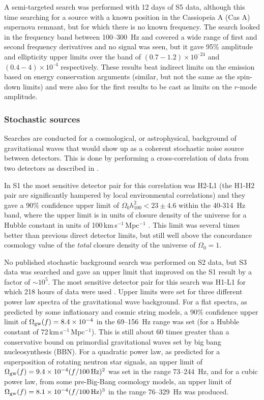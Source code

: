 \documentclass{article}
\begin{document}
A semi-targeted search was performed with 12 days of S5 data, although this time
searching for a source with a known position in the Cassiopeia A (Cas A) 
supernova remnant, but for which there is no known frequency. The search \cite{Abadie:2010g} looked
in the frequency band between 100--300~Hz and covered a wide range of first and 
second frequency derivatives and no signal was seen, but it gave 95\% amplitude 
and ellipticity upper limits over the 
band of $(0.7-1.2)\times10^{–24}$ and $(0.4-4)\times10^{–4}$ respectively. These results
beat indirect limits on the emission based on energy conservation arguments 
(similar, but not the same as the spin-down limits) and were also for the first results to be cast
as limits on the $r$-mode amplitude.

\subsubsection{Stochastic sources}
Searches are conducted for a cosmological, or astrophysical, background of gravitational 
waves that would show up as a coherent stochastic noise source between detectors. 
This is done by performing a cross-correlation of data from two detectors
as described in \cite{Allen:1999}.

In S1 the most sensitive detector pair for this correlation was H2-L1 (the
H1-H2 pair are significantly hampered by local environmental correlations) and
they gave a 90\% confidence upper limit of $\Omega_0h^2_{100} < 23\pm4.6$ within
the 40-314~Hz band, where the upper limit is in units of closure density of the
universe for a Hubble constant in units of 100\,km\,s$^{-1}$\,Mpc$^{-1}$
\cite{Abbott:2004e}. This limit was several times better than previous direct
detector limits, but still well above the concordance cosmology value of the
{\it total} closure density of the universe of $\Omega_0=1$.

No published stochastic background search was performed on S2 data, but S3 data
was searched and gave an upper limit that improved on the S1 result by a factor
of $\sim10^5$. The most sensitive detector pair for this search was H1-L1 for
which 218 hours of data were used \cite{Abbott:2005h}. Upper limits were set for
three different power law spectra of the gravitational wave background. For a
flat spectra, as predicted by some inflationary and cosmic string models, a 90\%
confidence upper limit of $\Omega_{\rm gw}(f) = 8.4\times10^{-4}$ in the
69--156~Hz range was set (for a Hubble constant of
72\,km\,s$^{-1}$\,Mpc$^{-1}$). This is still about 60 times greater than a
conservative bound on primordial gravitational waves set by big bang
nucleosynthesis (BBN). For a quadratic power law, as predicted for a
superposition of rotating neutron star signals, an upper limit of $\Omega_{\rm
gw}(f) = 9.4\times10^{-4}(f/100\,{\rm Hz})^2$ was set in the range 73--244~Hz,
and for a cubic power law, from some pre-Big-Bang cosmology models, an upper
limit of $\Omega_{\rm gw}(f) = 8.1\times10^{-4}(f/100\,{\rm Hz})^3$ in the range
76--329~Hz was produced.
\end{document}

